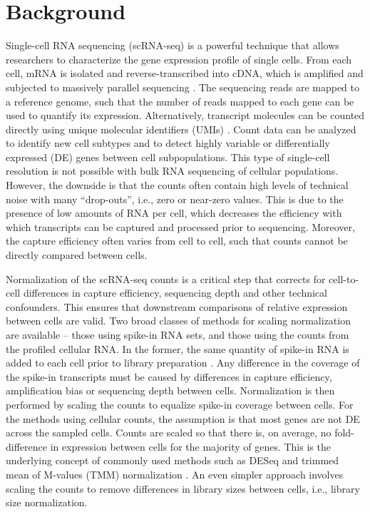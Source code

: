 \documentclass{bmcart}
\newcommand{\revised}[1]{#1}
\begin{document}
\section*{Background}
Single-cell RNA sequencing (scRNA-seq) is a powerful technique that allows researchers to characterize the gene expression profile of single cells.
From each cell, mRNA is isolated \revised{and reverse-transcribed into cDNA, which is amplified and} subjected to massively parallel sequencing \cite{stegle2015computational}.
The sequencing reads are mapped to a reference genome, such that the number of reads mapped to each gene can be used to quantify its expression.
Alternatively, transcript molecules can be counted directly using unique molecular identifiers (UMIs) \cite{islam2014quantitative}.
Count data can be analyzed to identify new cell subtypes and to detect highly variable or differentially expressed (DE) genes between cell subpopulations.
This type of single-cell resolution is not possible with bulk RNA sequencing of cellular populations.
However, the downside is that the counts often contain high levels of technical noise with many ``drop-outs'', i.e., zero or near-zero values.
This is due to the presence of low amounts of RNA per cell, which decreases the efficiency with which transcripts can be captured and processed prior to sequencing.
Moreover, the capture efficiency often varies from cell to cell, such that counts cannot be directly compared between cells.

Normalization of the scRNA-seq counts is a critical step that corrects for cell-to-cell differences in capture efficiency, sequencing depth and other technical confounders.
This ensures that downstream comparisons of relative expression between cells are valid.
Two broad classes of methods for scaling normalization are available -- those using spike-in RNA sets, and those using the counts from the profiled cellular RNA.
In the former, the same quantity of spike-in RNA is added to each cell prior to library preparation \cite{stegle2015computational}.
Any difference in the coverage of the spike-in transcripts must be caused by differences in capture efficiency\revised{, amplification bias or sequencing depth} between cells.
Normalization is then performed by scaling the counts to equalize spike-in coverage between cells.
For the methods using cellular counts, the assumption is that most genes are not DE across the sampled cells.
Counts are scaled so that there is, on average, no fold-difference in expression between cells for the majority of genes.
This is the underlying concept of commonly used methods such as DESeq \cite{anders2010differential} and trimmed mean of M-values (TMM) normalization \cite{robinson2010scaling}.
An even simpler approach involves scaling the counts to remove differences in library sizes between cells, i.e., library size normalization.
\end{document}
